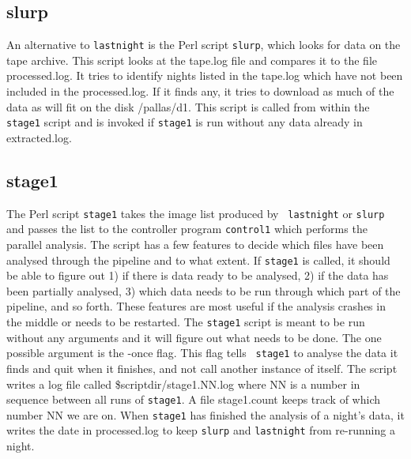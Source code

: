 \documentclass{article}
\begin{document}
\subsection{slurp}

An alternative to {\tt lastnight} is the Perl script {\tt slurp},
which looks for data on the tape archive.  This script looks at the
tape.log file and compares it to the file processed.log.  It tries to
identify nights listed in the tape.log which have not been included in
the processed.log.  If it finds any, it tries to download as much of
the data as will fit on the disk /pallas/d1.  This script is called
from within the {\tt stage1} script and is invoked if {\tt stage1} is
run without any data already in extracted.log.  

\subsection{stage1}

The Perl script {\tt stage1} takes the image list produced by {\tt
lastnight} or {\tt slurp} and passes the list to the controller
program {\tt control1} which performs the parallel analysis.  The
script has a few features to decide which files have been analysed
through the pipeline and to what extent.  If {\tt stage1} is called,
it should be able to figure out 1) if there is data ready to be
analysed, 2) if the data has been partially analysed, 3) which data
needs to be run through which part of the pipeline, and so forth.
These features are most useful if the analysis crashes in the middle
or needs to be restarted.  The {\tt stage1} script is meant to be run
without any arguments and it will figure out what needs to be done.
The one possible argument is the -once flag.  This flag tells {\tt
stage1} to analyse the data it finds and quit when it finishes, and
not call another instance of itself.  The script writes a log file
called \$scriptdir/stage1.NN.log where NN is a number in sequence
between all runs of {\tt stage1}.  A file stage1.count keeps track of
which number NN we are on.  When {\tt stage1} has finished the
analysis of a night's data, it writes the date in processed.log to
keep {\tt slurp} and {\tt lastnight} from re-running a night.
\end{document}
